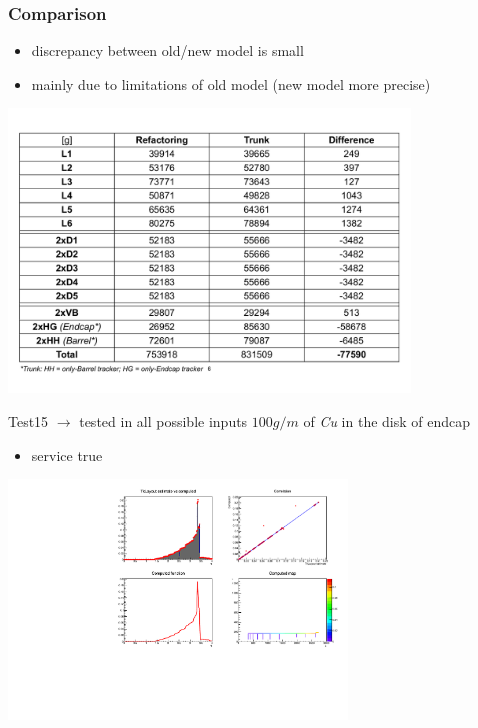 \documentclass[pdftex, 11pt]{beamer}
\begin{document}
\begin{frame}
  \frametitle{Comparison}
  \begin{itemize}
  \item \alert{discrepancy} between old/new model is \alert{small}
  \item mainly due to \alert{limitations} of old model (new model
    more precise) 
  \end{itemize}
  \vspace*{-0.5cm}
  \begin{center}
    \includegraphics[width=0.8\textwidth]{img/compareTab.pdf}
  \end{center}
\end{frame}

\begin{frame}
  \begin{block}{Test15 $\rightarrow$ \alert{tested in all possible inputs}}
    \alert{$100 g/m$} of \emph{Cu} in the disk of endcap
    \begin{itemize}
    \item \alert{service} true
    \end{itemize}
  \end{block}
  \begin{center}
    \includegraphics[width=9cm]{img/test15.pdf}
  \end{center}
\end{frame}
\end{document}
